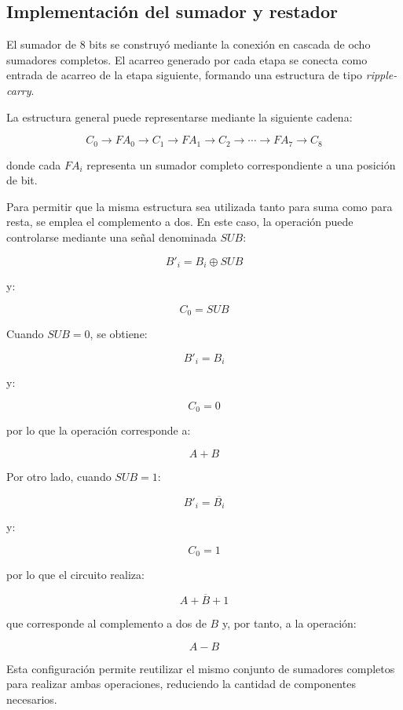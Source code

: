 \documentclass[12pt,a4paper]{article}
\begin{document}
\subsection{Implementación del sumador y restador}

El sumador de 8 bits se construyó mediante la conexión en cascada de ocho sumadores completos. El acarreo generado por cada etapa se conecta como entrada de acarreo de la etapa siguiente, formando una estructura de tipo \textit{ripple-carry}.

La estructura general puede representarse mediante la siguiente cadena:

\[
C_0 \rightarrow FA_0 \rightarrow C_1 \rightarrow FA_1 \rightarrow C_2
\rightarrow \cdots \rightarrow FA_7 \rightarrow C_8
\]

donde cada $FA_i$ representa un sumador completo correspondiente a una posición de bit.

Para permitir que la misma estructura sea utilizada tanto para suma como para resta, se emplea el complemento a dos. En este caso, la operación puede controlarse mediante una señal denominada $SUB$:

\begin{equation}
B'_i = B_i \oplus SUB
\end{equation}

y:

\begin{equation}
C_0 = SUB
\end{equation}

Cuando $SUB=0$, se obtiene:

\[
B'_i = B_i
\]

y:

\[
C_0=0
\]

por lo que la operación corresponde a:

\[
A+B
\]

Por otro lado, cuando $SUB=1$:

\[
B'_i = \overline{B_i}
\]

y:

\[
C_0=1
\]

por lo que el circuito realiza:

\[
A+\overline{B}+1
\]

que corresponde al complemento a dos de $B$ y, por tanto, a la operación:

\[
A-B
\]

Esta configuración permite reutilizar el mismo conjunto de sumadores completos para realizar ambas operaciones, reduciendo la cantidad de componentes necesarios.
\end{document}
